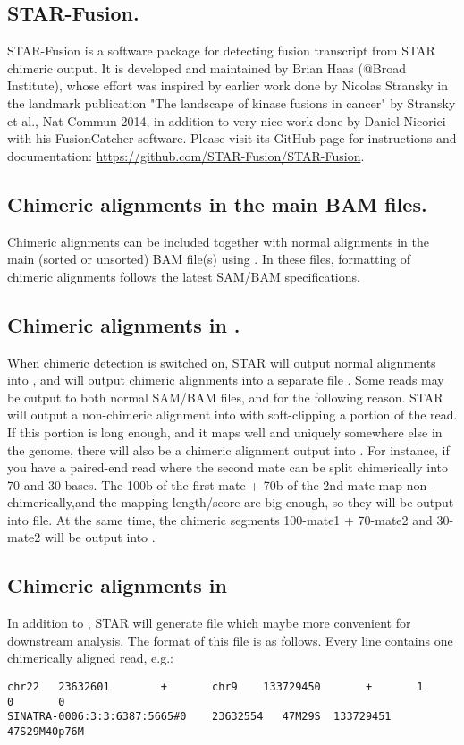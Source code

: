 \documentclass[12pt]{article}
\begin{document}
\subsection{STAR-Fusion.}
STAR-Fusion is a software package for detecting fusion transcript from STAR chimeric output. It is developed and maintained by Brian Haas (@Broad Institute), whose effort was  inspired by earlier work done by Nicolas Stransky in the landmark publication "The landscape of kinase fusions in cancer" by Stransky et al., Nat Commun 2014, in addition to very nice work done by Daniel Nicorici with his FusionCatcher software. Please visit its GitHub page for instructions and documentation: \url{https://github.com/STAR-Fusion/STAR-Fusion}.

\subsection{Chimeric alignments in the main BAM files.}
Chimeric alignments can be included together with normal alignments in the main (sorted or unsorted) BAM file(s) using  . In these files, formatting of chimeric alignments follows the latest SAM/BAM specifications.
   
\subsection{Chimeric alignments in  .}
When chimeric detection is switched on, STAR will output normal alignments into , and will output chimeric alignments into a separate file . 
Some reads may be output to both normal SAM/BAM files, and  for the following reason. STAR will output a non-chimeric alignment into  with soft-clipping a portion of the read. If this portion is long enough, and it maps well and uniquely  somewhere else in the genome, there will also be a chimeric alignment output into . For instance, if you have a paired-end read where the second mate can be split chimerically into 70 and 30 bases. The 100b of the first mate + 70b of the 2nd mate map non-chimerically,and the mapping length/score are big enough, so they will be output into  file. At the same time, the chimeric segments 100-mate1 + 70-mate2 and 30-mate2 will be output into .

\subsection{Chimeric alignments in }
In addition to , STAR will generate  file which maybe more convenient for downstream analysis.
The format of this file is as follows. Every line contains one chimerically aligned read, e.g.:
\begin{verbatim}
chr22   23632601        +       chr9    133729450       +       1       0       0      
SINATRA-0006:3:3:6387:5665#0    23632554   47M29S  133729451       47S29M40p76M
\end{verbatim}
\end{document}
